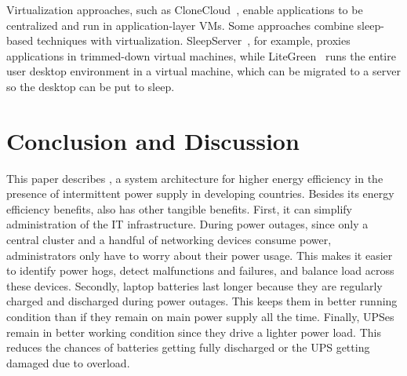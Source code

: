 Virtualization approaches, such as CloneCloud~\cite{clonecloud}, 
enable applications to be centralized and run in
application-layer VMs. Some approaches combine sleep-based techniques with virtualization.
SleepServer~\cite{Agarwal2010}, for example,
proxies applications in trimmed-down virtual machines, while 
LiteGreen~\cite{Das2009} runs the entire
user desktop environment in a virtual machine, which can be migrated
to a server so the desktop can be put to sleep.

\section{Conclusion and Discussion}
\label{sec:discussion}

This paper describes \anywaredc{}, a system architecture for higher energy efficiency in the
presence of intermittent power supply in developing countries. 
Besides its energy efficiency benefits, \anywaredc{}
also has other tangible benefits. First, it can simplify  administration of the IT
infrastructure. During power outages, since only a central cluster and a handful
of networking devices consume power, administrators only have to worry about their
power usage. This makes it easier to identify power hogs, detect malfunctions and failures,
and balance load across these devices. Secondly, laptop batteries last longer because they are regularly charged and
discharged during power outages. This keeps them in better running condition than if
they remain on main power supply all the time.
Finally, UPSes remain in better working condition since they drive a lighter
power load. This reduces the chances of batteries getting fully discharged or the UPS
getting damaged due to overload.







